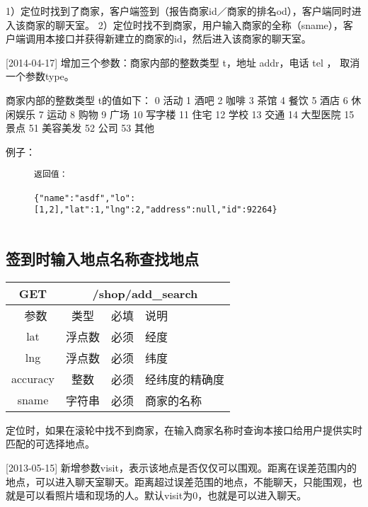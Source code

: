 \documentclass[cs4size]{ctexartutf8}
\begin{document}
1）定位时找到了商家，客户端签到（报告商家id／商家的排名od），客户端同时进入该商家的聊天室。
2）定位时找不到商家，用户输入商家的全称（sname），客户端调用本接口并获得新建立的商家的id，然后进入该商家的聊天室。


[2014-04-17] 增加三个参数：商家内部的整数类型 t，地址 addr，电话 tel ， 取消一个参数type。

商家内部的整数类型 t的值如下：
		0 活动
		1 酒吧
		2 咖啡
		3 茶馆
		4 餐饮
		5 酒店
		6 休闲娱乐
		7 运动
		8 购物
		9 广场
		10 写字楼
		11 住宅
		12 学校
		13 交通
		14 大型医院
		15 景点
		51 美容美发
		52 公司
		53 其他
		
例子：

\begin{figure}[H]
\begin{verbatim}
返回值：

{"name":"asdf","lo":[1,2],"lat":1,"lng":2,"address":null,"id":92264}


\end{verbatim}
\end{figure}



\subsection{签到时输入地点名称查找地点}

\begin{table}[H]
   \begin{center}
\begin{tabular}{|c|c|c|p{12cm}|}
\hline
GET & \multicolumn{3}{|c|}{/shop/add\_search} \\
\hline\hline
 \  参数  & 类型 & 必填 &  说明  \\
\hline
 lat  & 浮点数 & 必须 & 经度\\
\hline
 lng  &  浮点数 & 必须 & 纬度\\ 
\hline
 accuracy  & 整数 & 必须 & 经纬度的精确度\\ 
\hline
 sname  & 字符串 & 必须 &  商家的名称\\  
\hline
\end{tabular}
   \end{center}
\end{table}

定位时，如果在滚轮中找不到商家，在输入商家名称时查询本接口给用户提供实时匹配的可选择地点。

[2013-05-15] 新增参数visit，表示该地点是否仅仅可以围观。距离在误差范围内的地点，可以进入聊天室聊天。距离超过误差范围的地点，不能聊天，只能围观，也就是可以看照片墙和现场的人。默认visit为0，也就是可以进入聊天。
\end{document}
